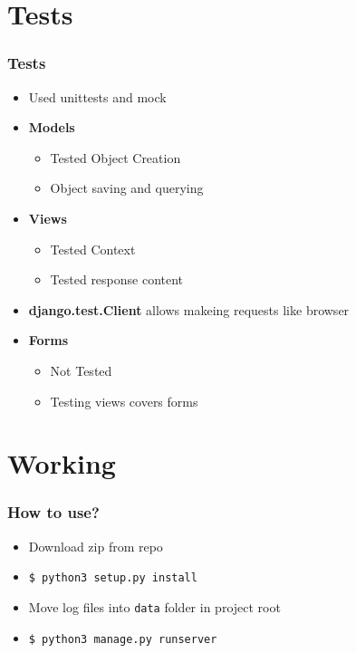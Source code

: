 \documentclass{beamer}
\begin{document}
\section{Tests}
\begin{frame}
    \frametitle{Tests}
    \begin{itemize}
        \item Used unittests and mock
        \item \textbf{Models}
        \begin{itemize}
            \item Tested Object Creation
            \item Object saving and querying
        \end{itemize}
        \item \textbf{Views}
        \begin{itemize}
            \item Tested Context
            \item Tested response content
        \end{itemize}
        \item \textbf{django.test.Client} allows makeing requests like browser
        \item \textbf{Forms}
        \begin{itemize}
            \item Not Tested
            \item Testing views covers forms
        \end{itemize}
    \end{itemize}
\end{frame}

\section{Working}
\begin{frame}
    \frametitle{How to use?}
    \begin{itemize}
        \item Download zip from repo
        \item \texttt{\$ python3 setup.py install}
        \item Move log files into \texttt{data} folder in project root
        \item \texttt{\$ python3 manage.py runserver}
    \end{itemize}
\end{frame}
\end{document}
